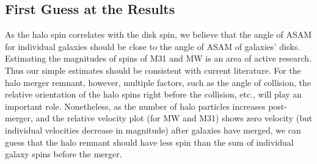 \documentclass[twocolumn]{aastex631}
\begin{document}
\subsection{First Guess at the Results}

As the halo spin correlates with the disk spin, we believe that the angle of ASAM for individual galaxies should be close to the angle of ASAM of galaxies' disks. Estimating the magnitudes of spins of M31 and MW is an area of active research. Thus our simple estimates should be consistent with current literature. For the halo merger remnant, however, multiple factors, such as the angle of collision,  the relative orientation of the halo spins right before the collision, etc., will play an important role. Nonetheless, as the number of halo particles increases post-merger, and the relative velocity plot (for MW and M31) shows zero velocity (but individual velocities decrease in magnitude) after galaxies have merged, we can guess that the halo remnant should have less spin than the sum of individual galaxy spins before the merger. 




\clearpage
{}



\end{document}
